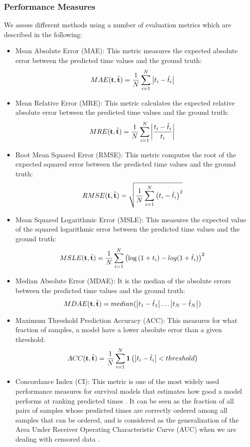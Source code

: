 \subsubsection{Performance Measures}
We assess different methods using a number of evaluation metrics which are described in the following:
\begin{itemize}
\item Mean Absolute Error (MAE): This metric measures the expected absolute error between the predicted time values and the ground truth:
\[MAE(\mathbf{t},\hat{\mathbf{t}}) = \frac{1}{N}\sum_{i=1}^{N}\left|t_i-\hat{t}_i\right|\]
\item Mean Relative Error (MRE): This metric calculates the expected relative absolute error between the predicted time values and the ground truth:
\[MRE(\mathbf{t},\hat{\mathbf{t}}) = \frac{1}{N}\sum_{i=1}^{N}\left|\frac{t_i-\hat{t}_i}{t_i}\right|\]
\item Root Mean Squared Error (RMSE): This metric computes the root of the expected squared error between the predicted time values and the ground truth:
\[RMSE(\mathbf{t},\hat{\mathbf{t}}) = \sqrt{\frac{1}{N}\sum_{i=1}^{N}\left(t_i-\hat{t}_i\right)^2}\]
\item Mean Squared Logarithmic Error (MSLE): This measures the expected value of the squared logarithmic error between the predicted time values and the ground truth:
\[MSLE(\mathbf{t},\hat{\mathbf{t}}) = \frac{1}{N}\sum_{i=1}^{N}\left(\log{(1+t_i)}-log{(1+\hat{t}_i)}\right)^2\]
\item Median Absolute Error (MDAE): It is the median of the absolute errors between the predicted time values and the ground truth:
\[MDAE(\mathbf{t},\hat{\mathbf{t}}) = median(\left|t_1-\hat{t}_1\right|\dots\left|t_N-\hat{t}_N\right|)\]
\item Maximum Threshold Prediction Accuracy (ACC): This measures for what fraction of samples, a model have a lower absolute error than a given threshold:
\[ACC(\mathbf{t},\hat{\mathbf{t}})=\frac{1}{N}\sum_{i=1}^{N}\mathbf{1}\left(\left|t_i-\hat{t}_i\right| < threshold\right)\]
\item \color{red}Concordance Index (CI): This metric is one of the most widely used performance measures for survival models that estimates how good a model performs at ranking predicted times \cite{harrell1982evaluating}. It can be seen as the fraction of all pairs of samples whose predicted times are correctly ordered among all samples that can be ordered, and is considered as the generalization of the Area Under Receiver Operating Characteristic Curve (AUC) when we are dealing with censored data \cite{steck2008ranking}.
\end{itemize}

